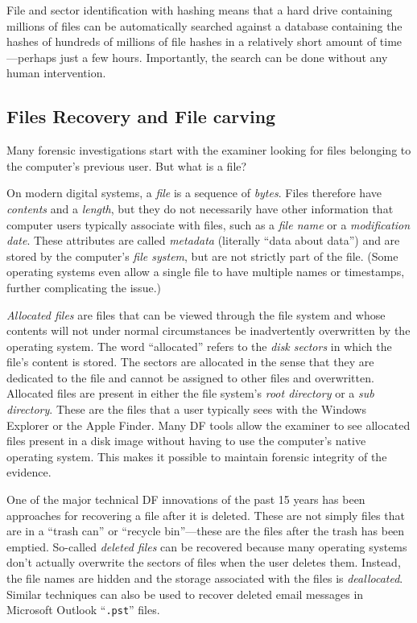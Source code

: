 \documentclass[11pt,letter]{article}
\begin{document}
File and sector identification with hashing means that a hard drive
containing millions of files can be automatically searched against a
database containing the hashes of hundreds of millions of file hashes
in a relatively short amount of time---perhaps just a few hours. Importantly, the search can be done without any human
intervention.

\subsection{Files Recovery and File carving}

Many forensic investigations start with the examiner looking for
files belonging to the computer's previous user. But what is a file?

On modern digital systems, a \emph{file} is a sequence of
\emph{bytes}. Files therefore
have \emph{contents} and a \emph{length}, but they do not necessarily have other
information that computer users typically associate with files, such
as a \emph{file name} or a \emph{modification date}. These attributes
are called \emph{metadata} (literally ``data about data'')
and are stored by the computer's \emph{file system}, but are not
strictly part of the file. (Some operating systems even allow a single
file to have multiple names or timestamps, further complicating the
issue.)

\emph{Allocated files} are files that can be viewed
through the file system and whose contents will not under normal
circumstances be inadvertently overwritten by the operating
system. The word ``allocated'' refers to the \emph{disk sectors} in
which the file's content is stored. The sectors are allocated in the
sense that they are dedicated to the file and cannot be assigned to
other files and overwritten. Allocated files are present in either the
file system's \emph{root directory} or a \emph{sub directory}. These
are the files that a user typically sees with the Windows Explorer or
the Apple Finder. Many DF tools allow the examiner to see allocated
files present in a disk image without having to use the computer's
native operating system. This makes it possible to maintain forensic
integrity of the evidence.

One of the major technical DF innovations of the
past 15 years has been approaches for
recovering a file after it is deleted. These are not simply files that are in
a ``trash can'' or ``recycle bin''---these are the files after the
trash has been emptied. So-called \emph{deleted files} can be
recovered because many operating systems don't actually overwrite the
sectors of files when the user deletes them. Instead, the file names
are hidden and the storage associated with the files is
\emph{deallocated}. Similar techniques can also be used to
recover deleted email messages in Microsoft Outlook ``\texttt{.pst}'' files.
\end{document}
